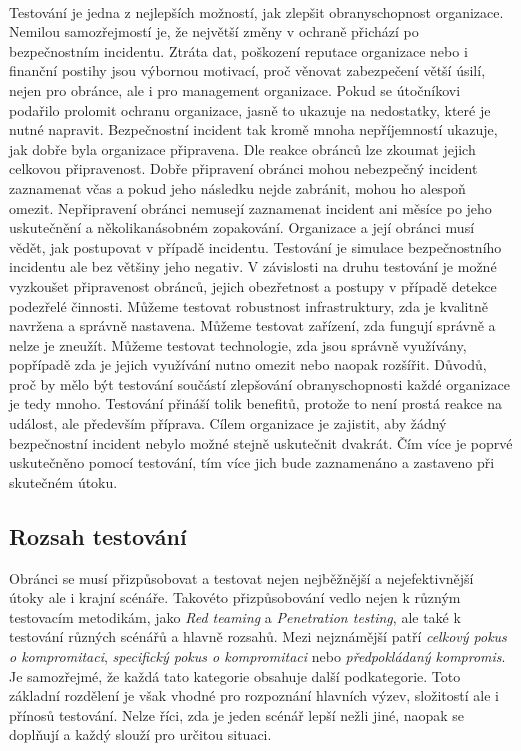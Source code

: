 \paragraph{}
Testování je jedna z nejlepších možností, jak zlepšit obranyschopnost organizace.
Nemilou samozřejmostí je, že největší změny v ochraně přichází po bezpečnostním incidentu.
Ztráta dat, poškození reputace organizace nebo i finanční postihy jsou výbornou motivací, proč věnovat zabezpečení větší úsilí, nejen pro obránce, ale i pro management organizace.
Pokud se útočníkovi podařilo prolomit ochranu organizace, jasně to ukazuje na nedostatky, které je nutné napravit.
Bezpečnostní incident tak kromě mnoha nepříjemností ukazuje, jak dobře byla organizace připravena.
Dle reakce obránců lze zkoumat jejich celkovou připravenost.
Dobře připravení obránci mohou nebezpečný incident zaznamenat včas a pokud jeho následku nejde zabránit, mohou ho alespoň omezit.
Nepřipravení obránci nemusejí zaznamenat incident ani měsíce po jeho uskutečnění a několikanásobném zopakování.
Organizace a její obránci musí vědět, jak postupovat v případě incidentu.
Testování je simulace bezpečnostního incidentu ale bez většiny jeho negativ.
V závislosti na druhu testování je možné vyzkoušet připravenost obránců, jejich obezřetnost a postupy v případě detekce podezřelé činnosti.
Můžeme testovat robustnost infrastruktury, zda je kvalitně navržena a správně nastavena.
Můžeme testovat zařízení, zda fungují správně a nelze je zneužít.
Můžeme testovat technologie, zda jsou správně využívány, popřípadě zda je jejich využívání nutno omezit nebo naopak rozšířit.
Důvodů, proč by mělo být testování součástí zlepšování obranyschopnosti každé organizace je tedy mnoho.
Testování přináší tolik benefitů, protože to není prostá reakce na událost, ale především příprava.
Cílem organizace je zajistit, aby žádný bezpečnostní incident nebylo možné stejně uskutečnit dvakrát.
Čím více je poprvé uskutečněno pomocí testování, tím více jich bude zaznamenáno a zastaveno při skutečném útoku.


\subsection{Rozsah testování}\label{subsec:rozsah-testovni}
Obránci se musí přizpůsobovat a testovat nejen nejběžnější a nejefektivnější útoky ale i krajní scénáře.
Takovéto přizpůsobování vedlo nejen k různým testovacím metodikám, jako \textit{Red teaming} a \textit{Penetration testing}, ale také k testování různých scénářů a hlavně rozsahů.
Mezi nejznámější patří \textit{celkový pokus o kompromitaci}, \textit{specifický pokus o kompromitaci} nebo \textit{předpokládaný kompromis}.
Je samozřejmé, že každá tato kategorie obsahuje další podkategorie.
Toto základní rozdělení je však vhodné pro rozpoznání hlavních výzev, složitostí ale i přínosů testování.
Nelze říci, zda je jeden scénář lepší nežli jiné, naopak se doplňují a každý slouží pro určitou situaci.\cite{red_team_oakley_2019}

